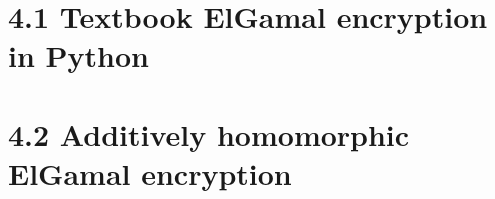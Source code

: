 \documentclass{article}
\begin{document}
	\pagestyle{fancy}
	\hfill
	
	\section*{4.1 Textbook ElGamal encryption in Python}
	\begin{adjustwidth}{-6em}{}
	\end{adjustwidth}
	
	\section*{4.2 Additively homomorphic ElGamal encryption}
	\begin{adjustwidth}{-6em}{}
	\end{adjustwidth}
\end{document}
